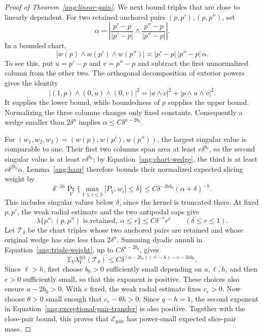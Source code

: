 \begin{proof}[Proof of Theorem~\ref{ang:linear-gain}]
We next bound triples that are close to linearly dependent. For two
retained anchored pairs $(p,p'),(p,p'')$, set
\[
 \alpha=\left|
 \frac{p'-p}{|p'-p|}\wedge\frac{p''-p}{|p''-p|}\right|.
\]
In a bounded chart,
\begin{equation}\label{ang:chart-wedge}
 |w(p)\wedge w(p')\wedge w(p'')|
       \asymp |p'-p|\,|p''-p|\,\alpha.
\end{equation}
To see this, put $u=p'-p$ and $v=p''-p$ and subtract the first
unnormalized column from the other two. The orthogonal decomposition
of exterior powers gives the identity
\[
 |(1,p)\wedge(0,u)\wedge(0,v)|^2
       =|u\wedge v|^2+|p\wedge u\wedge v|^2.
\]
It supplies the lower bound, while boundedness of $p$ supplies the
upper bound. Normalizing the three columns changes only fixed constants.
Consequently a wedge smaller than $2\delta^a$ implies
$\alpha\le C\delta^{a-2b_0}$.

For $(w_1,w_2,w_3)=(w(p),w(p'),w(p''))$, the largest singular
value is comparable to one. Their first two columns span area at least $c\delta^{b_0}$,
so the second singular value is at least $c\delta^{b_0}$; by
Equation~\eqref{ang:chart-wedge}, the third is at least
$c\delta^{2b_0}\alpha$. Lemma~\ref{ang:haar} therefore bounds
their normalized expected slicing weight by
\begin{equation}\label{ang:triple-weight}
 \delta^{-3h}\Pr_V\{\max_{1\le i\le3}|P_{V^\perp}w_i|\le\delta\}
 \le C\delta^{-3hb_0}(\alpha+\delta)^{-h}.
\end{equation}
This includes singular values below $\delta$, since the kernel is
truncated there. At fixed $p,p'$, the weak radial estimate and
the two antipodal caps give
\[
 \lambda\{p'':(p,p'')\text{ is retained},\ \alpha\le r\}
       \le C\delta^{-e}r^\ell
       \qquad(\delta\le r\le1).
\]
Let $\mathcal T_\delta$ be the chart triples whose two anchored pairs
are retained and whose original wedge has size less than $2\delta^a$.
Summing dyadic annuli in Equation~\eqref{ang:triple-weight}, up to
$C\delta^{a-2b_0}$, gives
\begin{equation}\label{ang:bad-triples}
 \mathbb E_V\lambda_V^{\otimes3}(\mathcal T_\delta)
 \le C\delta^{(a-2b_0)(\ell-h)-e-3hb_0}.
\end{equation}
Since $\ell>h$, first choose $b_0>0$ sufficiently small depending
on $a,\ell,h$, and then $e>0$ sufficiently small, so that this
exponent is positive. These choices also ensure $a-2b_0>0$.
With $e$ fixed, the weak radial estimate fixes $c_e>0$. Now choose
$\theta>0$ small enough that $c_e-\theta h>0$. Since $q-h=1$, the
second exponent in Equation~\eqref{ang:exceptional-pair-transfer} is
also positive. Together with the close-pair bound, this proves that
$\mathcal E_{\mathrm{pair}}$ has power-small expected slice-pair mass.


\end{proof}
